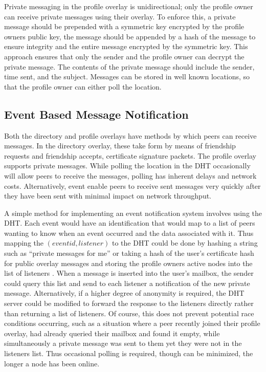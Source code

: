 \documentclass[conference]{IEEEtran}
\begin{document}
Private messaging in the profile overlay is unidirectional; only the profile
owner can receive private messages using their overlay.  To enforce this, a
private message should be prepended with a symmetric key encrypted by the
profile owners public key, the message should be appended by a hash of the
message to ensure integrity and the entire message encrypted by the symmetric
key.  This approach ensures that only the sender and the profile owner can
decrypt the private message.  The contents of the private message should
include the sender, time sent, and the subject.  Messages can be stored in well
known locations, so that the profile owner can either poll the location.

\subsection{Event Based Message Notification}

Both the directory and profile overlays have methods by which peers can receive
messages.  In the directory overlay, these take form by means of friendship
requests and friendship accepts, certificate signature packets.  The profile
overlay supports private messages.  While polling the location in the DHT
occasionally will allow peers to receive the messages, polling has inherent
delays and network costs.  Alternatively, event  enable peers to receive sent
messages very quickly after they have been sent with minimal impact on network
throughput.

A simple method for implementing an event notification system involves using
the DHT.  Each event would have an identification that would map to a list of
peers wanting to know when an event occurred and the data associated with it.
Thus mapping the $(event id, listener)$ to the DHT could be done by hashing a
string such as ``private messages for me'' or taking a hash of the user's
certificate hash for public overlay messages and storing the profile owners
active nodes into the list of listeners .  When a message is inserted into the
user's mailbox, the sender could query this list and send to each listener a
notification of the new private message.  Alternatively, if a higher degree of
anonymity is required, the DHT server could be modified to forward the response
to the listeners directly rather than returning a list of listeners.  Of
course, this does not prevent potential race conditions occurring, such as a
situation where a peer recently joined their profile overlay, had already
queried their mailbox and found it empty, while simultaneously a private
message was sent to them yet they were not in the listeners list.  Thus
occasional polling is required, though can be minimized, the longer a node has
been online.
\end{document}
